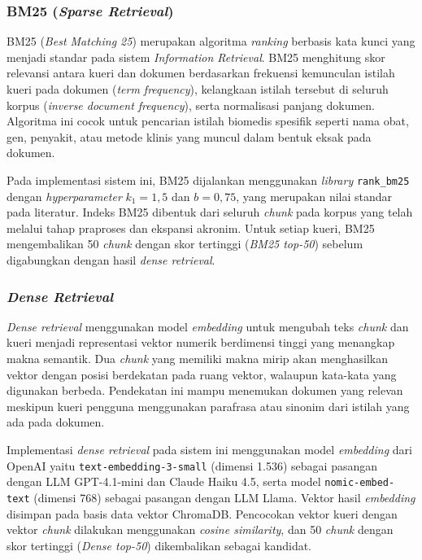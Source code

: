 \subsubsection{BM25 (\textit{Sparse Retrieval})}
\label{subsubsec:bm25}

BM25 (\textit{Best Matching 25}) merupakan algoritma \textit{ranking} berbasis kata kunci yang menjadi standar pada sistem \textit{Information Retrieval}. BM25 menghitung skor relevansi antara kueri dan dokumen berdasarkan frekuensi kemunculan istilah kueri pada dokumen (\textit{term frequency}), kelangkaan istilah tersebut di seluruh korpus (\textit{inverse document frequency}), serta normalisasi panjang dokumen. Algoritma ini cocok untuk pencarian istilah biomedis spesifik seperti nama obat, gen, penyakit, atau metode klinis yang muncul dalam bentuk eksak pada dokumen.

Pada implementasi sistem ini, BM25 dijalankan menggunakan \textit{library} \texttt{rank\_bm25} dengan \textit{hyperparameter} $k_1 = 1{,}5$ dan $b = 0{,}75$, yang merupakan nilai standar pada literatur. Indeks BM25 dibentuk dari seluruh \textit{chunk} pada korpus yang telah melalui tahap praproses dan ekspansi akronim. Untuk setiap kueri, BM25 mengembalikan 50 \textit{chunk} dengan skor tertinggi (\textit{BM25 top-50}) sebelum digabungkan dengan hasil \textit{dense retrieval}.

\subsubsection{\textit{Dense Retrieval}}
\label{subsubsec:dense-retrieval}

\textit{Dense retrieval} menggunakan model \textit{embedding} untuk mengubah teks \textit{chunk} dan kueri menjadi representasi vektor numerik berdimensi tinggi yang menangkap makna semantik. Dua \textit{chunk} yang memiliki makna mirip akan menghasilkan vektor dengan posisi berdekatan pada ruang vektor, walaupun kata-kata yang digunakan berbeda. Pendekatan ini mampu menemukan dokumen yang relevan meskipun kueri pengguna menggunakan parafrasa atau sinonim dari istilah yang ada pada dokumen.

Implementasi \textit{dense retrieval} pada sistem ini menggunakan model \textit{embedding} dari OpenAI yaitu \texttt{text-embedding-3-small} (dimensi 1.536) sebagai pasangan dengan LLM GPT-4.1-mini dan Claude Haiku 4.5, serta model \texttt{nomic-embed-text} (dimensi 768) sebagai pasangan dengan LLM Llama. Vektor hasil \textit{embedding} disimpan pada basis data vektor ChromaDB. Pencocokan vektor kueri dengan vektor \textit{chunk} dilakukan menggunakan \textit{cosine similarity}, dan 50 \textit{chunk} dengan skor tertinggi (\textit{Dense top-50}) dikembalikan sebagai kandidat.

